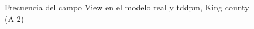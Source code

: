 \begin{figure}[H]
    \centering
    
    \caption{Frecuencia del campo View en el modelo real y tddpm, King county (A-2)}
    \label{frecuency-tddpm-view}
\end{figure}